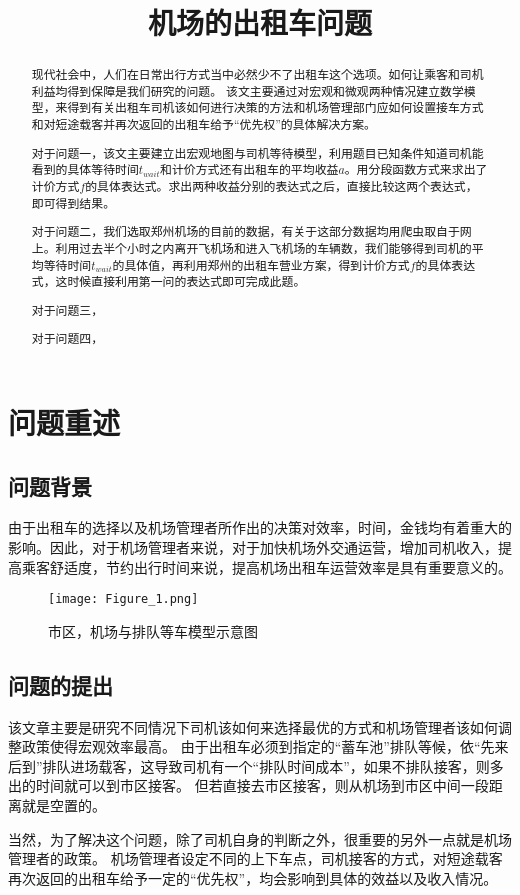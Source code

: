 \documentclass{cumcmthesis}
\title{机场的出租车问题}
\begin{document}
\maketitle
\begin{abstract}
	现代社会中，人们在日常出行方式当中必然少不了出租车这个选项。如何让乘客和司机利益均得到保障是我们研究的问题。
	该文主要通过对宏观和微观两种情况建立数学模型，来得到有关出租车司机该如何进行决策的方法和机场管理部门应如何设置接车方式和对短途载客并再次返回的出租车给予“优先权”的具体解决方案。
	\par
	对于问题一，该文主要建立出宏观地图与司机等待模型，利用题目已知条件知道司机能看到的具体等待时间$t_{wait}$和计价方式还有出租车的平均收益$a$。用分段函数方式来求出了计价方式$f$的具体表达式。求出两种收益分别的表达式之后，直接比较这两个表达式，即可得到结果。
	\par
	对于问题二，我们选取郑州机场的目前的数据，有关于这部分数据均用爬虫取自于网上。利用过去半个小时之内离开飞机场和进入飞机场的车辆数，我们能够得到司机的平均等待时间$t_{wait}$的具体值，再利用郑州的出租车营业方案，得到计价方式$f$的具体表达式，这时候直接利用第一问的表达式即可完成此题。
	\par
	对于问题三，
	\par
	对于问题四，
	\par
\end{abstract}

\tableofcontents
\newpage
\section{问题重述}
\subsection{问题背景}
由于出租车的选择以及机场管理者所作出的决策对效率，时间，金钱均有着重大的影响。因此，对于机场管理者来说，对于加快机场外交通运营，增加司机收入，提高乘客舒适度，节约出行时间来说，提高机场出租车运营效率是具有重要意义的。
\begin{figure}[!h]
	\centering
	\texttt{[image: Figure\_1.png]}
	\caption{市区，机场与排队等车模型示意图}
\end{figure}

\subsection{问题的提出}
该文章主要是研究不同情况下司机该如何来选择最优的方式和机场管理者该如何调整政策使得宏观效率最高。
由于出租车必须到指定的“蓄车池”排队等候，依“先来后到”排队进场载客，这导致司机有一个“排队时间成本”，如果不排队接客，则多出的时间就可以到市区接客。
但若直接去市区接客，则从机场到市区中间一段距离就是空置的。
\par 
当然，为了解决这个问题，除了司机自身的判断之外，很重要的另外一点就是机场管理者的政策。
机场管理者设定不同的上下车点，司机接客的方式，对短途载客再次返回的出租车给予一定的“优先权”，均会影响到具体的效益以及收入情况。
\end{document}
